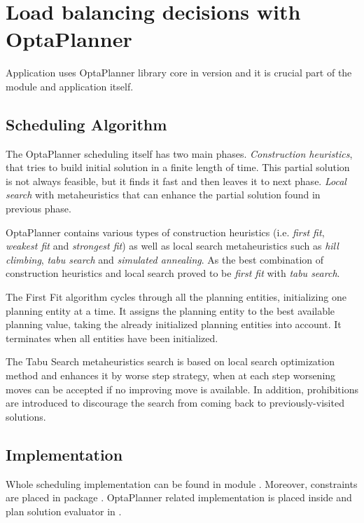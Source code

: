\section{Load balancing decisions with OptaPlanner}\label{sec:load-balancing-optaplanner}

Application uses OptaPlanner library core in version \cite{optaplannerDoc}
and it is crucial part of the  module and application itself.

\subsection{Scheduling Algorithm}
The OptaPlanner scheduling itself has two main phases.
\textit{Construction heuristics}, that tries to build initial solution in a finite length of time.
This partial solution is not always feasible, 
but it finds it fast and then leaves it to next phase.
\textit{Local search} with metaheuristics that can enhance the partial solution found in previous phase.

OptaPlanner contains various types of construction heuristics (i.e. \textit{first fit}, \textit{weakest fit} and \textit{strongest fit})
as well as local search metaheuristics such as \textit{hill climbing}, \textit{tabu search} and \textit{simulated annealing}.
As the best combination of construction heuristics and local search proved to be \textit{first fit} with \textit{tabu search}.

The First Fit algorithm cycles through all the planning entities,
initializing one planning entity at a time. 
It assigns the planning entity to the best available planning value, 
taking the already initialized planning entities into account.
It terminates when all entities have been initialized\cite{optaplannerDoc:heuristics}.

The Tabu Search metaheuristics search is based on local search optimization method
and enhances it by worse step strategy, 
when at each step worsening moves can be accepted if no improving move is available.
In addition, prohibitions are introduced to discourage the search from coming back to previously-visited solutions\cite{glover1989tabu}.

\subsection{Implementation}
Whole scheduling implementation can be found in module .
Moreover, 
constraints are placed in package .
OptaPlanner related implementation is placed inside 
and plan solution evaluator in .

